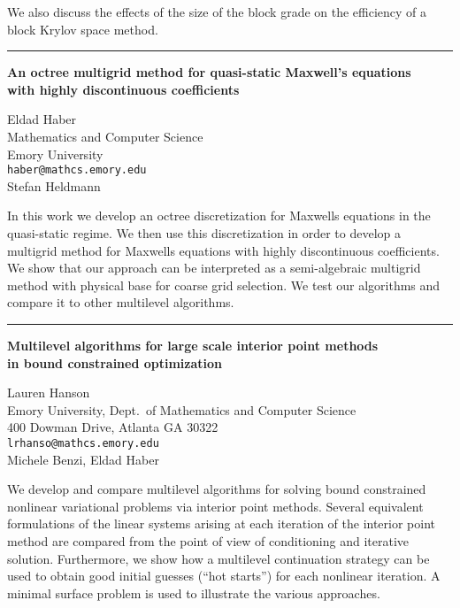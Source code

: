 \documentclass[twosided]{report}
\begin{document}
We also discuss the effects of
the size of the block grade on the efficiency of a block
Krylov space method.



	\begin{center} \rule{6in}{1pt} \end{center}

\begin{center}
{\large			%
{\bf An octree multigrid method for quasi-static Maxwell's equations \\
	with highly discontinuous coefficients}}

	Eldad Haber \\
	Mathematics and Computer Science \\
	Emory University \\
	{\tt haber@mathcs.emory.edu}
	\\ Stefan Heldmann
\end{center}
In this work we develop an octree discretization for
Maxwells equations in the quasi-static regime.  We then use
this discretization in order to develop a multigrid method
for Maxwells equations with highly discontinuous
coefficients.  We show that our approach can be interpreted
as a semi-algebraic multigrid method with physical base for
coarse grid selection.  We test our algorithms and compare
it to other multilevel algorithms.


	\begin{center} \rule{6in}{1pt} \end{center}

\begin{center}
{\large			%
{\bf Multilevel algorithms for large scale interior point methods \\
	in bound constrained optimization}}

	Lauren Hanson \\
	Emory University, Dept.~of Mathematics and Computer Science \\
	400 Dowman Drive, Atlanta GA 30322 \\
	{\tt lrhanso@mathcs.emory.edu} \\
	Michele Benzi, Eldad Haber
\end{center}
We develop and compare multilevel algorithms for solving
bound constrained nonlinear variational problems via
interior point methods. Several equivalent formulations of
the linear systems arising at each iteration of the interior
point method are compared from the point of view of
conditioning and iterative solution. Furthermore, we show
how a multilevel continuation strategy can be used to obtain
good initial guesses (``hot starts'') for each
nonlinear iteration. A minimal surface problem is used to
illustrate the various approaches.
\end{document}
